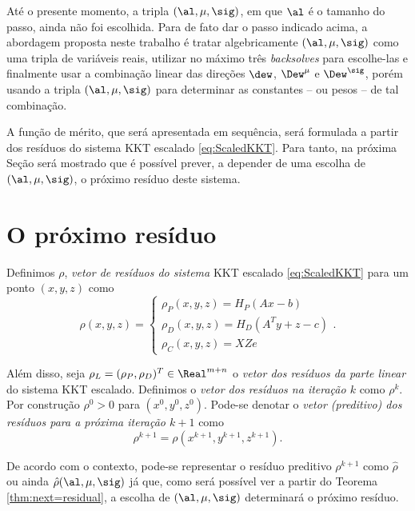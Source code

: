 Até o presente momento, a tripla $(\al, \mu,\sig)$, em que $\al$ é o tamanho do
passo, ainda não foi escolhida. Para de fato dar o passo indicado acima, a
abordagem proposta neste trabalho é tratar algebricamente $(\al, \mu,\sig)$ como
uma tripla de variáveis reais, utilizar no máximo três \emph{backsolves} para
escolhe-las e finalmente usar a combinação linear das direções $\dew$,
$\Dew^\mu$ e $\Dew^\sig$, porém usando a tripla $(\al,\mu,\sig)$ para determinar
as constantes -- ou pesos --  de tal combinação.




A função de mérito, que será  apresentada em sequência, será formulada a partir
dos resíduos do sistema KKT escalado \eqref{eq:ScaledKKT}. Para tanto, na
próxima Seção será mostrado que é possível prever, a depender de
uma escolha de $(\al, \mu,\sig)$, o próximo resíduo deste sistema.


\section{O próximo resíduo}

\begin{defin} 
\label{def:residual-vector}
Definimos  $\rho$, \emph{vetor de resíduos do sistema} \ac{KKT}  escalado
\eqref{eq:ScaledKKT} para um ponto $(x,y,z)$ como
\begin{equation}
\label{eq:residuals}
\rho(x,y,z) = 
\begin{cases}
\rho_P (x,y,z)= H_P(A{x} -b)  \\
\rho_D(x,y,z)= H_D(A^T{y} +{z} -c) \\
\rho_C(x,y,z)= {X}{Z}e
\end{cases}.
\end{equation}

Além disso, seja  $\rho_L = (\rho_P,\rho_D)^T\in\Real^{m+n}$ o \emph{vetor dos
resíduos da parte linear} do  sistema \ac{KKT} escalado. Definimos o
\emph{vetor dos resíduos na iteração $k$} como $\rho^k$.
Por construção $\rho^0>0$ para $(x^0,y^0,z^0)$.
Pode-se denotar o \emph{vetor (preditivo) dos resíduos  para a próxima iteração
$k+1$} como \[  \rho^{k+1} = \rho(x^{k+1},y^{k+1},z^{k+1}).
\]
\end{defin} 

\begin{obs}
De acordo com o contexto, pode-se representar o resíduo preditivo 
$\rho^{k+1}$ como $\hat{\rho}$ ou ainda $\hat{\rho}(\al,\mu,\sig)$ já que, como
será possível ver a partir do Teorema \ref{thm:next=residual}, a
escolha de $(\al,\mu,\sig)$ determinará o próximo resíduo.




\end{obs}


